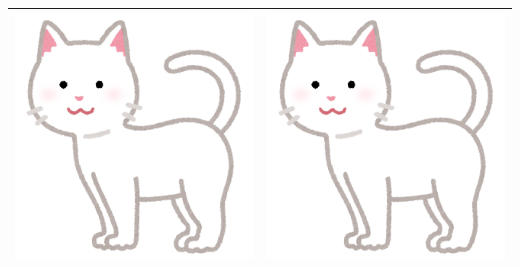 \documentclass[11pt]{article}
\begin{document}
\begin{table}[htbp]
\begin{tabular}{|c|c|}
            \hline
            \includegraphics[scale=0.2, angle=270]{cat02_moyou_white} & \includegraphics[scale=0.1]{cat02_moyou_white}          \\
            \hline
        \end{tabular}
    \end{table}
\end{document}
